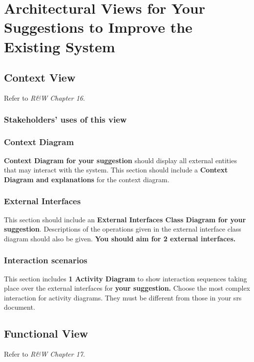 \chapter{Architectural Views for Your Suggestions to Improve the Existing System} \label{suggest}


\section{Context View}

Refer to \textit{R\&W Chapter 16}. 

\subsection{Stakeholders’ uses of this view}

\subsection{Context Diagram}

\textbf{Context Diagram for your suggestion} should display all external entities that may interact with the system. This section should include a \textbf{Context Diagram and explanations} for the context diagram.

\subsection{External Interfaces}
This section should include an \textbf{External Interfaces Class Diagram for your suggestion}. Descriptions of the operations given in the external interface class diagram should also be given. \textbf{You should aim for 2 external interfaces.}

\subsection{Interaction scenarios}
This section includes \textbf{1 Activity Diagram} to show interaction sequences taking place over the external interfaces for \textbf{your suggestion.} Choose the most complex interaction for activity diagrams. They must be different from those in your \gls{srs} document.




\section{Functional View}

Refer to \textit{R\&W Chapter 17}. 

